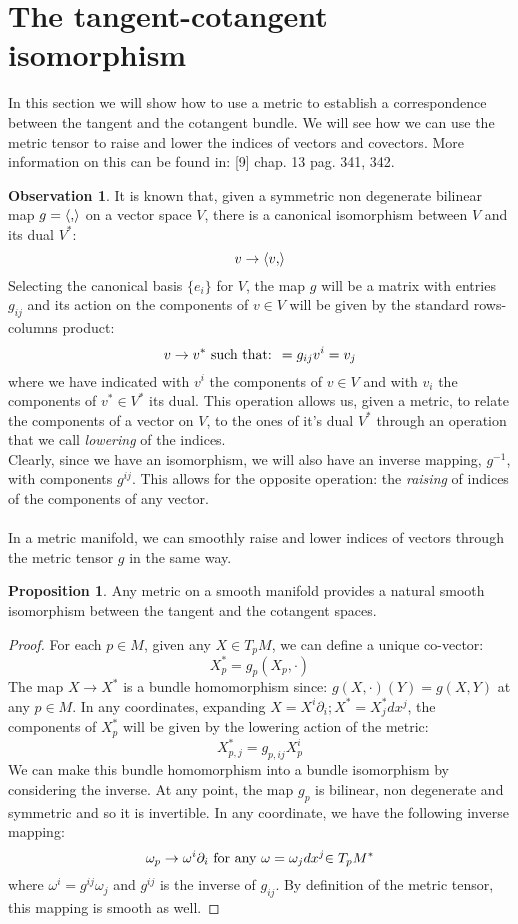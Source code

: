 \documentclass[12pt,a4paper]{report}
\theoremstyle{definition}
\theoremstyle{Theorem}
\newtheorem{Prop}[Def]{Proposition}
\theoremstyle{definition}
\theoremstyle{definition}
\newtheorem{Obs}[Def]{Observation}
\begin{document}
	\section{The tangent-cotangent isomorphism}\label{Sec_3.3}
	In this section we will show how to use a metric to establish a correspondence between the tangent and the cotangent bundle. We will see how we can use the metric tensor to raise and lower the indices of vectors and covectors. More information on this can be found in: [9] chap. 13 pag. 341, 342.
	\begin{Obs}
		It is known that, given a symmetric non degenerate bilinear map $g=\braket{,}$ on a vector space $V$, there is a canonical isomorphism between $V$ and its dual $V^*$:
		$$v\rightarrow\braket{v,}$$
		Selecting the canonical basis $\{e_i\}$ for $V$, the map $g$ will be a matrix with entries $g_{ij}$ and its action on the components of $v\in V$ will be given by the standard rows-columns product:
		$$v\rightarrow
		v^*\hbox{ such that: }=g_{ij}v^i=v_j$$
		where we have indicated with $v^i$ the components of $v\in V$ and with $v_i$ the components of $v^*\in V^*$ its dual. This operation allows us, given a metric, to relate the components of a vector on $V$, to the ones of it's dual $V^*$ through an operation that we call \textit{lowering} of the indices.\\
		Clearly, since we have an isomorphism, we will also have an inverse mapping, $g^{-1}$, with components $g^{ij}$. This allows for the opposite operation: the \textit{raising} of indices of the components of any vector.\\
		\\
		In a metric manifold, we can smoothly raise and lower indices of vectors through the metric tensor $g$ in the same way.
	\end{Obs}
	\begin{Prop}
		Any metric on a smooth manifold provides a natural smooth isomorphism between the tangent and the cotangent spaces.
	\end{Prop}
	\begin{proof}
		For each $p\in M$, given any $X\in T_pM$, we can define a unique co-vector: 
		$$X^*_p=g_p(X_p,\cdot)$$
		The map $X\rightarrow X^*$ is a bundle homomorphism since: $g(X,\cdot )(Y)=g(X,Y)$ at any $p\in M$.
		In any coordinates, expanding $X=X^i\partial_i;X^*=X^*_jdx^j$, the components of $X^*_p$ will be given by the lowering action of the metric:
		$$X^*_{p,j}=g_{p,ij}X_p^i$$
		We can make this bundle homomorphism into a bundle isomorphism by considering the inverse. At any point, the map $g_p$ is bilinear, non degenerate and symmetric and so it is invertible. In any coordinate, we have the following inverse mapping:
		$$\omega_p\rightarrow\omega^i\partial_i\hbox{ for any }\omega=\omega_jdx^j{\in T_pM^*}$$
		where $\omega^i=g^{ij}\omega_j$ and $g^{ij}$ is the inverse of $g_{ij}$. By definition of the metric tensor, this mapping is smooth as well. 
	\end{proof}
\end{document}
